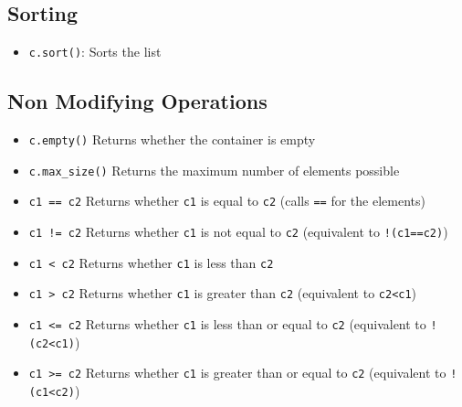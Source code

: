 \documentclass{report}
\begin{document}
\bigbreak \noindent 
\subsection{Sorting}
\bigbreak \noindent 
\begin{itemize}
    \item \texttt{c.sort()}: Sorts the list
\end{itemize}

\pagebreak 
{}
\bigbreak \noindent 
\subsection{Non Modifying Operations}
\bigbreak \noindent 
\begin{itemize}
    \item \texttt{c.empty()} Returns whether the container is empty
    \item \texttt{c.max\_size()} Returns the maximum number of elements possible
    \item \texttt{c1 == c2} Returns whether \texttt{c1} is equal to \texttt{c2} (calls \texttt{==} for the elements)
    \item \texttt{c1 != c2} Returns whether \texttt{c1} is not equal to \texttt{c2} (equivalent to \texttt{!(c1==c2)})
    \item \texttt{c1 < c2} Returns whether \texttt{c1} is less than \texttt{c2}
    \item \texttt{c1 > c2} Returns whether \texttt{c1} is greater than \texttt{c2} (equivalent to \texttt{c2<c1})
    \item \texttt{c1 <= c2} Returns whether \texttt{c1} is less than or equal to \texttt{c2} (equivalent to \texttt{!(c2<c1)})
    \item \texttt{c1 >= c2} Returns whether \texttt{c1} is greater than or equal to \texttt{c2} (equivalent to \texttt{!(c1<c2)})
\end{itemize}

\bigbreak \noindent 
\end{document}
